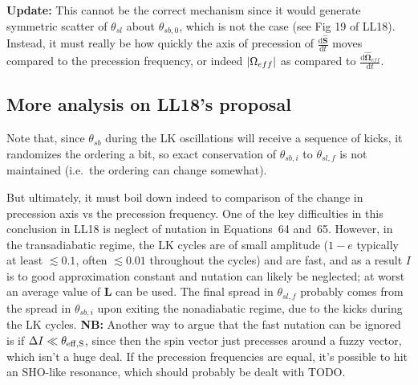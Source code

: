 \documentclass[11pt,
        usenames, %
        dvipsnames %
    ]{article}
\newcommand*{\rd}[2]{\frac{\mathrm{d}#1}{\mathrm{d}#2}}
\newcommand*{\bm}[1]{\boldsymbol{\mathbf{#1}}}
\DeclarePairedDelimiter\abs{\lvert}{\rvert}
\begin{document}
\textbf{Update:} This cannot be the correct mechanism since it would generate
symmetric scatter of $\theta_{sl}$ about $\theta_{sb, 0}$, which is not the case
(see Fig 19 of LL18). Instead, it must really be how quickly the axis of
precession of $\rd{\hat{\bm{S}}}{t}$ moves compared to the precession
frequency, or indeed $\abs*{\Omega_{eff}}$ as compared to
$\rd{\hat{\bm{\Omega}}_{eff}}{t}$.

\subsection{More analysis on LL18's proposal}

Note that, since $\theta_{sb}$ during the LK oscillations will receive a
sequence of kicks, it randomizes the ordering a bit, so exact conservation of
$\theta_{sb, i}$ to $\theta_{sl, f}$ is not maintained (i.e.\ the ordering can
change somewhat).

But ultimately, it must boil down indeed to comparison of the change in
precession axis vs the precession frequency. One of the key difficulties in this
conclusion in LL18 is neglect of nutation in Equations~64 and~65. However, in
the transadiabatic regime, the LK cycles are of small amplitude ($1 - e$
typically at least $\lesssim 0.1$, often $\lesssim 0.01$ throughout the cycles)
and are fast, and as a result $I$ is to good approximation constant and nutation
can likely be neglected; at worst an average value of $\bm{L}$ can be used. The
final spread in $\theta_{sl, f}$ probably comes from the spread in $\theta_{sb,
i}$ upon exiting the nonadiabatic regime, due to the kicks during the LK cycles.
\textbf{NB:} Another way to argue that the fast nutation can be ignored is if
$\Delta I \ll \theta_{\rm eff, S}$, since then the spin vector just precesses
around a fuzzy vector, which isn't a huge deal. If the precession frequencies
are equal, it's possible to hit an SHO-like resonance, which should probably be
dealt with TODO\@.
\end{document}
